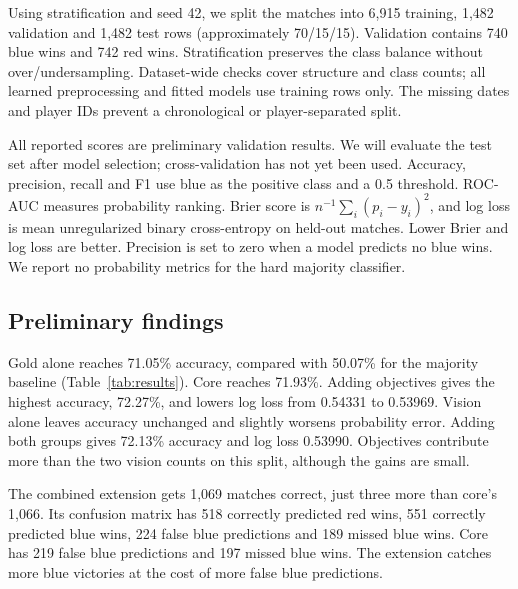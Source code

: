 \documentclass[11pt]{article}
\begin{document}
Using stratification and seed 42, we split the matches into 6,915 training, 1,482 validation and 1,482 test rows (approximately 70/15/15). Validation contains 740 blue wins and 742 red wins. Stratification preserves the class balance without over/undersampling. Dataset-wide checks cover structure and class counts; all learned preprocessing and fitted models use training rows only. The missing dates and player IDs prevent a chronological or player-separated split.

All reported scores are preliminary validation results. We will evaluate the test set after model selection; cross-validation has not yet been used. Accuracy, precision, recall and F1 use blue as the positive class and a 0.5 threshold. ROC-AUC measures probability ranking. Brier score is $n^{-1}\sum_i(p_i-y_i)^2$, and log loss is mean unregularized binary cross-entropy on held-out matches. Lower Brier and log loss are better. Precision is set to zero when a model predicts no blue wins. We report no probability metrics for the hard majority classifier.

\begin{table}[t]
\centering
\small

\caption{Preliminary validation results on the same 1,482 matches. LR is L2 logistic regression; RF is random forest. Blue is the positive class. Lower Brier and log loss are better. Probability baseline scores use the training win rate. No test scores are reported.}
\label{tab:results}
\end{table}

\subsection{Preliminary findings}

Gold alone reaches 71.05\% accuracy, compared with 50.07\% for the majority baseline (Table~\ref{tab:results}). Core reaches 71.93\%. Adding objectives gives the highest accuracy, 72.27\%, and lowers log loss from 0.54331 to 0.53969. Vision alone leaves accuracy unchanged and slightly worsens probability error. Adding both groups gives 72.13\% accuracy and log loss 0.53990. Objectives contribute more than the two vision counts on this split, although the gains are small.

The combined extension gets 1,069 matches correct, just three more than core's 1,066. Its confusion matrix has 518 correctly predicted red wins, 551 correctly predicted blue wins, 224 false blue predictions and 189 missed blue wins. Core has 219 false blue predictions and 197 missed blue wins. The extension catches more blue victories at the cost of more false blue predictions.
\end{document}
